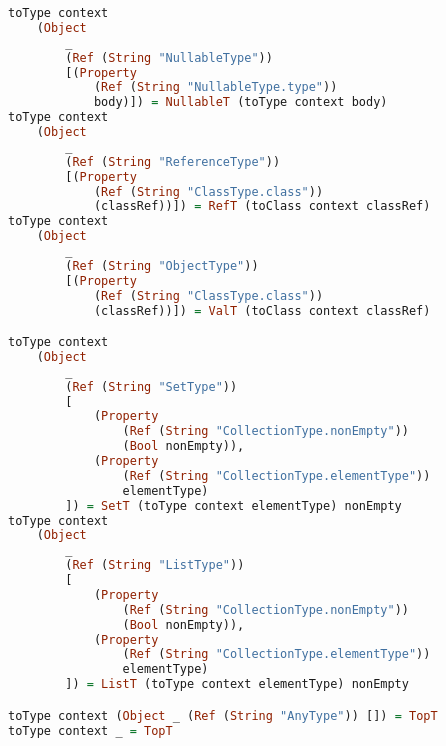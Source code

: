 \begin{lstlisting}[language=Haskell]
toType context 
	(Object 
		_ 
		(Ref (String "NullableType")) 
		[(Property 
			(Ref (String "NullableType.type")) 
			body)]) = NullableT (toType context body)
toType context 
	(Object 
		_ 
		(Ref (String "ReferenceType")) 
		[(Property 
			(Ref (String "ClassType.class")) 
			(classRef))]) = RefT (toClass context classRef)
toType context 
	(Object 
		_ 
		(Ref (String "ObjectType")) 
		[(Property 
			(Ref (String "ClassType.class")) 
			(classRef))]) = ValT (toClass context classRef)

toType context 
	(Object 
		_ 
		(Ref (String "SetType")) 
		[
			(Property 
				(Ref (String "CollectionType.nonEmpty")) 
				(Bool nonEmpty)),
			(Property 
				(Ref (String "CollectionType.elementType")) 
				elementType)
		]) = SetT (toType context elementType) nonEmpty
toType context 
	(Object 
		_ 
		(Ref (String "ListType")) 
		[
			(Property 
				(Ref (String "CollectionType.nonEmpty")) 
				(Bool nonEmpty)),
			(Property 
				(Ref (String "CollectionType.elementType")) 
				elementType)
		]) = ListT (toType context elementType) nonEmpty

toType context (Object _ (Ref (String "AnyType")) []) = TopT
toType context _ = TopT
\end{lstlisting}
